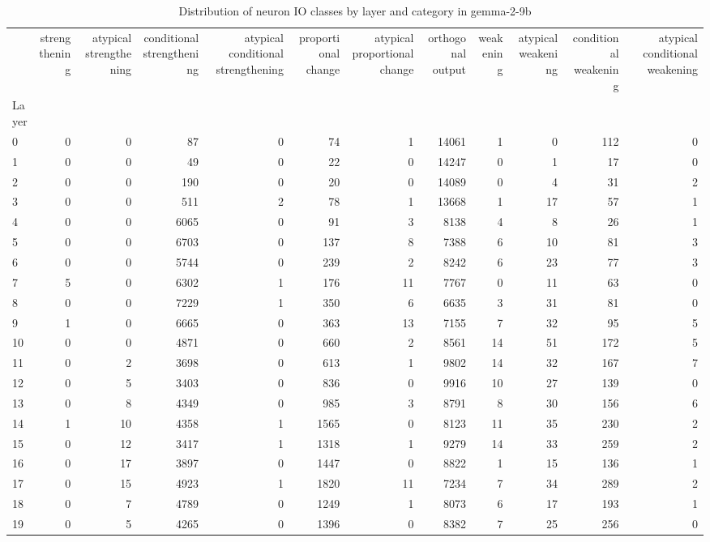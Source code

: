 \begin{table}
\caption{Distribution of neuron IO classes by layer and category in gemma-2-9b}
\label{tab:gemma-2-9b}
\begin{tabular}{lrrrrrrrrrrr}
 & strengthening & atypical strengthening & conditional strengthening & atypical conditional strengthening & proportional change & atypical proportional change & orthogonal output & weakening & atypical weakening & conditional weakening & atypical conditional weakening \\
Layer &  &  &  &  &  &  &  &  &  &  &  \\
0 & 0 & 0 & 87 & 0 & 74 & 1 & 14061 & 1 & 0 & 112 & 0 \\
1 & 0 & 0 & 49 & 0 & 22 & 0 & 14247 & 0 & 1 & 17 & 0 \\
2 & 0 & 0 & 190 & 0 & 20 & 0 & 14089 & 0 & 4 & 31 & 2 \\
3 & 0 & 0 & 511 & 2 & 78 & 1 & 13668 & 1 & 17 & 57 & 1 \\
4 & 0 & 0 & 6065 & 0 & 91 & 3 & 8138 & 4 & 8 & 26 & 1 \\
5 & 0 & 0 & 6703 & 0 & 137 & 8 & 7388 & 6 & 10 & 81 & 3 \\
6 & 0 & 0 & 5744 & 0 & 239 & 2 & 8242 & 6 & 23 & 77 & 3 \\
7 & 5 & 0 & 6302 & 1 & 176 & 11 & 7767 & 0 & 11 & 63 & 0 \\
8 & 0 & 0 & 7229 & 1 & 350 & 6 & 6635 & 3 & 31 & 81 & 0 \\
9 & 1 & 0 & 6665 & 0 & 363 & 13 & 7155 & 7 & 32 & 95 & 5 \\
10 & 0 & 0 & 4871 & 0 & 660 & 2 & 8561 & 14 & 51 & 172 & 5 \\
11 & 0 & 2 & 3698 & 0 & 613 & 1 & 9802 & 14 & 32 & 167 & 7 \\
12 & 0 & 5 & 3403 & 0 & 836 & 0 & 9916 & 10 & 27 & 139 & 0 \\
13 & 0 & 8 & 4349 & 0 & 985 & 3 & 8791 & 8 & 30 & 156 & 6 \\
14 & 1 & 10 & 4358 & 1 & 1565 & 0 & 8123 & 11 & 35 & 230 & 2 \\
15 & 0 & 12 & 3417 & 1 & 1318 & 1 & 9279 & 14 & 33 & 259 & 2 \\
16 & 0 & 17 & 3897 & 0 & 1447 & 0 & 8822 & 1 & 15 & 136 & 1 \\
17 & 0 & 15 & 4923 & 1 & 1820 & 11 & 7234 & 7 & 34 & 289 & 2 \\
18 & 0 & 7 & 4789 & 0 & 1249 & 1 & 8073 & 6 & 17 & 193 & 1 \\
19 & 0 & 5 & 4265 & 0 & 1396 & 0 & 8382 & 7 & 25 & 256 & 0 \\

\end{tabular}
\end{table}
